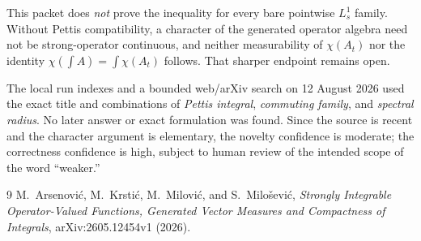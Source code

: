 \documentclass[11pt]{article}
\theoremstyle{remark}
\begin{document}
This packet does \emph{not} prove the inequality for every bare pointwise
$L_s^1$ family.  Without Pettis compatibility, a character of the generated
operator algebra need not be strong-operator continuous, and neither
measurability of $\chi(A_t)$ nor the identity
$\chi(\int A)=\int\chi(A_t)$ follows.  That sharper endpoint remains open.

The local run indexes and a bounded web/arXiv search on 12 August 2026 used
the exact title and combinations of \emph{Pettis integral}, \emph{commuting
family}, and \emph{spectral radius}.  No later answer or exact formulation was
found.  Since the source is recent and the character argument is elementary,
the novelty confidence is moderate; the correctness confidence is high,
subject to human review of the intended scope of the word ``weaker.''

\begin{thebibliography}{9}
M.~Arsenovi\'c, M.~Krsti\'c, M.~Milovi\'c, and S.~Milo\v sevi\'c,
\emph{Strongly Integrable Operator-Valued Functions, Generated Vector
Measures and Compactness of Integrals}, arXiv:2605.12454v1 (2026).
\end{thebibliography}
\end{document}
